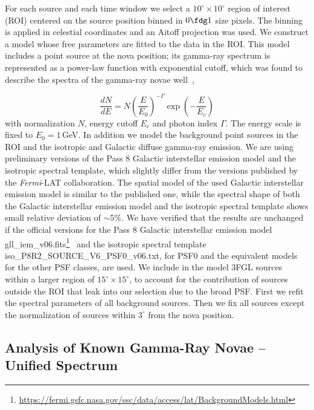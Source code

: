 \documentclass{aa} %
\begin{document}
For each source and each time window we select a $10^\circ \times 10^\circ$ region of interest (ROI) centered on the source position binned in $0\fdg1$ size pixels. The binning is applied in celestial coordinates and an Aitoff projection was used. We construct a model whose free parameters are fitted to the data in the ROI. This model includes a point source at the nova position; its gamma-ray spectrum is represented as a power-law function with exponential cutoff, which was found to describe the spectra of the gamma-ray novae well~\citep{2014Sci...345..554A},

\begin{equation}
\frac{dN}{dE} = N \left(\frac{E}{E_0}\right)^{-\Gamma} \exp \left(-\frac{E}{E_c}\right)
\label{eq:PLExp}
\end{equation}
with normalization $N$, energy cutoff $E_c$ and photon index $\Gamma$. The energy scale is fixed to $E_0 = 1$\,GeV. In addition we model the background point sources in the ROI and the isotropic and Galactic diffuse gamma-ray emission. We are using preliminary versions of the Pass 8 Galactic interstellar emission model and the isotropic spectral template, which slightly differ from the versions published by the \textit{Fermi}-LAT collaboration. 
The spatial model of the used Galactic interstellar emission model is similar to the published one, while the spectral shape of both the Galactic interstellar emission model and the isotropic spectral template shows small relative deviation of $\sim5\%$. We have verified that the results are unchanged if the official versions for the Pass 8 Galactic interstellar emission model \textsf{gll\_iem\_v06.fits}\footnote{\url{https://fermi.gsfc.nasa.gov/ssc/data/access/lat/BackgroundModels.html}}~\citep{Acero:2016qlg} and the isotropic spectral template \textsf{iso\_P8R2\_SOURCE\_V6\_PSF0\_v06.txt}, for PSF0 and the equivalent models for the other PSF classes, are used. We include in the model 3FGL sources~\citep{2015ApJS..218...23A} within a larger region of $15^\circ \times 15^\circ$, to account for the contribution of sources outside the ROI that leak into our selection due to the broad PSF. First we refit the spectral parameters of all background sources. Then we fix all sources except the normalization of sources within $3^\circ$ from the nova position.


\subsection{Analysis of Known Gamma-Ray Novae -- Unified Spectrum}
\label{subsec:knownNovae}
\end{document}
